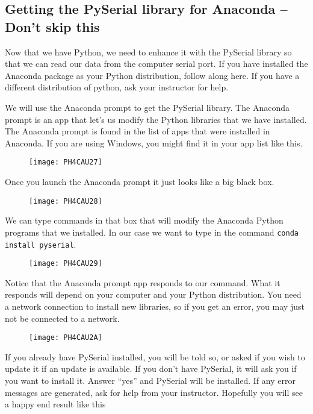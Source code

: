 \subsection{Getting the PySerial library for Anaconda -- Don't skip this}

Now that we have Python, we need to enhance it with the PySerial library so that we can read our data from the computer serial port. If you have installed the Anaconda package as your Python distribution, follow along here. If you have a different distribution of python, ask your instructor for help.

We will use the Anaconda prompt to get the PySerial library. The Anaconda prompt is an app that let's us modify the Python libraries that we have installed. The Anaconda prompt is found in the list of apps that were installed in Anaconda. If you are using Windows, you might find it in your app list like this.

\begin{figure}[h!]
	\centering
	\texttt{[image: PH4CAU27]}
\end{figure}

Once you launch the Anaconda prompt it just looks like a big black box. 

\begin{figure}[h!]
	\centering
	\texttt{[image: PH4CAU28]}
\end{figure}

We can type commands in that box that will modify the Anaconda Python programs that we installed. In our case we want to type in the command \texttt{conda install pyserial}.

\begin{figure}[h!]
	\centering
	\texttt{[image: PH4CAU29]}
\end{figure}

Notice that the Anaconda prompt app responds to our command. What it responds will depend on your computer and your Python distribution. You need a network connection to install new libraries, so if you get an error, you may just not be connected to a network.

\begin{figure}[h!]
	\centering
	\texttt{[image: PH4CAU2A]}
\end{figure}

If you already have PySerial installed, you will be told so, or asked if you wish to update it if an update is available. If you don't have PySerial, it will ask you if you want to install it. Answer ``yes'' and PySerial will be installed. If any error messages are generated, ask for help from your instructor. Hopefully you will see a happy end result like this 

